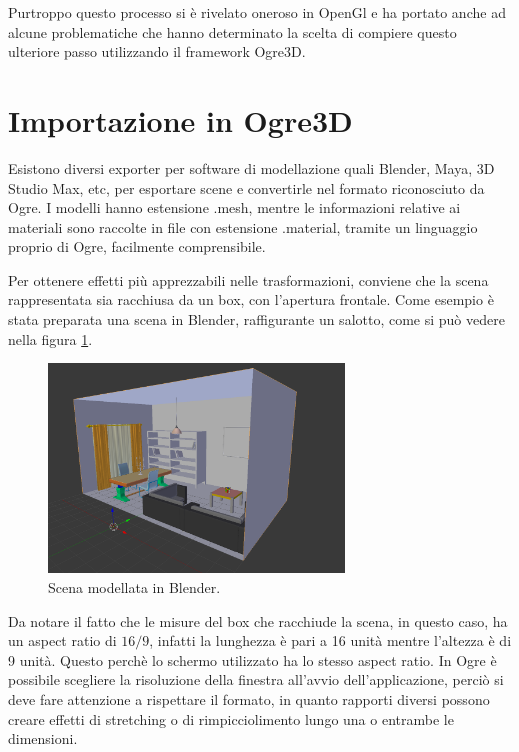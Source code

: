 Purtroppo questo processo si è rivelato oneroso in OpenGl e ha portato anche ad alcune problematiche che hanno determinato la scelta di compiere questo ulteriore passo utilizzando il framework Ogre3D.

\section{Importazione in Ogre3D}
Esistono diversi exporter per software di modellazione quali Blender, Maya, 3D Studio Max, etc, per esportare scene e convertirle nel formato riconosciuto da Ogre. I modelli hanno estensione .mesh, mentre le informazioni relative ai materiali sono raccolte in file con estensione .material, tramite un linguaggio proprio di Ogre, facilmente comprensibile.

Per ottenere effetti più apprezzabili nelle trasformazioni, conviene che la scena rappresentata sia racchiusa da un box, con l'apertura frontale. Come esempio è stata preparata una scena in Blender, raffigurante un salotto, come si può vedere nella figura \ref{liv-room}.

\begin{figure}[htbp]
\centering
\includegraphics[width=0.7\textwidth]{images/progetto/living-room.png}
\caption{Scena modellata in Blender.\label{liv-room}}
\end{figure}

Da notare il fatto che le misure del box che racchiude la scena, in questo caso, ha un aspect ratio di $16/9$, infatti la lunghezza è pari a 16 unità mentre l'altezza è di 9 unità. Questo perchè lo schermo utilizzato ha lo stesso aspect ratio. In Ogre è possibile scegliere la risoluzione della finestra all'avvio dell'applicazione, perciò si deve fare attenzione a rispettare il formato, in quanto rapporti diversi possono creare effetti di stretching o di rimpicciolimento lungo una o entrambe le dimensioni.

